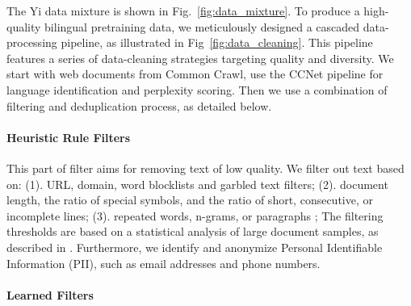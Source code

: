 The Yi data mixture is shown in Fig.~\ref{fig:data_mixture}.
To produce a high-quality bilingual pretraining data, 
we meticulously designed a cascaded data-processing pipeline, as illustrated in Fig~\ref{fig:data_cleaning}. 
This pipeline features a series of data-cleaning strategies targeting  quality and diversity. 
We start with web documents from Common Crawl, use the CCNet pipeline \citep{Wenzek:2019aa} for language identification and perplexity  scoring. 
Then we use a combination of filtering and deduplication process, as detailed below. 




\paragraph{Heuristic Rule Filters} 
This part of filter aims for removing text of low quality. 
We filter out text based on: 
(1). URL, domain, word blocklists and garbled text filters; 
(2). document length, the ratio of special symbols, and the ratio of short, consecutive, or incomplete lines;
(3). repeated words, n-grams, or paragraphs \citep{rae2021scaling};
The filtering thresholds are based on a statistical analysis of large document samples, as described in \citet{nguyen2023culturax}. 
Furthermore, we identify and anonymize Personal Identifiable Information (PII), such as email addresses and phone numbers.


\paragraph{Learned Filters} 


